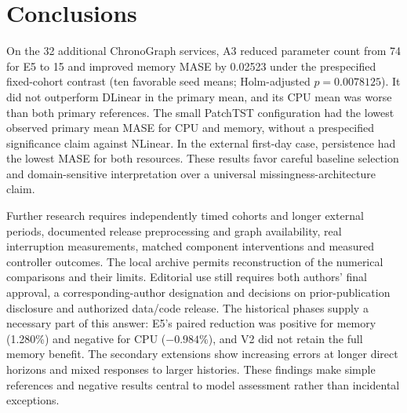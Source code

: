 \section{Conclusions}
On the 32 additional ChronoGraph services, A3 reduced parameter count from 74 for E5 to 15 and improved memory MASE by 0.02523 under the prespecified fixed-cohort contrast (ten favorable seed means; Holm-adjusted $p=0.0078125$). It did not outperform DLinear in the primary mean, and its CPU mean was worse than both primary references. The small PatchTST configuration had the lowest observed primary mean MASE for CPU and memory, without a prespecified significance claim against NLinear. In the external first-day case, persistence had the lowest MASE for both resources. These results favor careful baseline selection and domain-sensitive interpretation over a universal missingness-architecture claim.

Further research requires independently timed cohorts and longer external periods, documented release preprocessing and graph availability, real interruption measurements, matched component interventions and measured controller outcomes. The local archive permits reconstruction of the numerical comparisons and their limits. Editorial use still requires both authors' final approval, a corresponding-author designation and decisions on prior-publication disclosure and authorized data/code release.
The historical phases supply a necessary part of this answer: E5's paired reduction was positive for memory (1.280\%) and negative for CPU ($-0.984\%$), and V2 did not retain the full memory benefit. The secondary extensions show increasing errors at longer direct horizons and mixed responses to larger histories. These findings make simple references and negative results central to model assessment rather than incidental exceptions.
